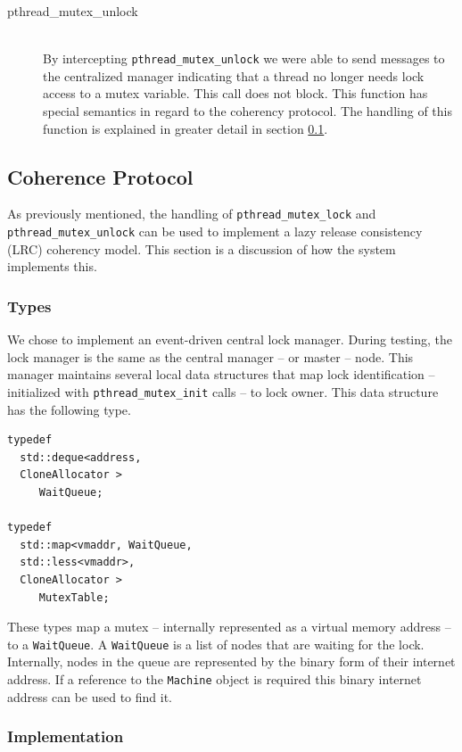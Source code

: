 \begin{description}
\item[pthread\_mutex\_unlock] \hfill \\
By intercepting \verb,pthread_mutex_unlock, we were able to send messages to the centralized manager indicating that a thread no longer needs lock access to a mutex variable.  This call does not block.  This function has special semantics in regard to the coherency protocol.   The handling of this function is explained in greater detail in section \ref{coherency-protocol}.
\end{description}

\subsection{Coherence Protocol}
\label{coherency-protocol}

As previously mentioned, the handling of \verb,pthread_mutex_lock, and \verb,pthread_mutex_unlock, can be used to implement a lazy release consistency (LRC) coherency model.  This section is a discussion of how the \projname{} system implements this.

\subsubsection{Types}
We chose to implement an event-driven central lock manager.  During testing, the lock manager is the same as the central manager -- or master -- node.  This manager maintains several local data structures that map lock identification -- initialized with \verb,pthread_mutex_init, calls -- to lock owner.  This data structure has the following type.

\begin{verbatim}
typedef
  std::deque<address,
  CloneAllocator >
     WaitQueue;

typedef
  std::map<vmaddr, WaitQueue,
  std::less<vmaddr>,
  CloneAllocator >
     MutexTable;
\end{verbatim}

These types map a mutex -- internally represented as a virtual memory address -- to a \verb,WaitQueue,.  A \verb,WaitQueue, is a list of nodes that are waiting for the lock.  Internally, nodes in the queue are represented by the binary form of their internet address.  If a reference to the \verb,Machine, object is required this binary internet address can be used to find it.

\subsubsection{Implementation}

